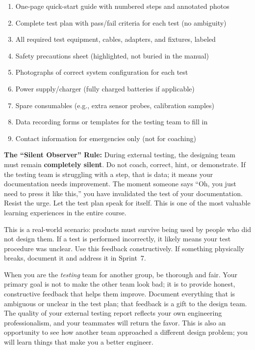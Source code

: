 \begin{checklistbox}
\begin{enumerate}[leftmargin=*, itemsep=1pt, topsep=0pt]
    \item One-page quick-start guide with numbered steps and annotated photos
    \item Complete test plan with pass/fail criteria for each test (no ambiguity)
    \item All required test equipment, cables, adapters, and fixtures, labeled
    \item Safety precautions sheet (highlighted, not buried in the manual)
    \item Photographs of correct system configuration for each test
    \item Power supply/charger (fully charged batteries if applicable)
    \item Spare consumables (e.g., extra sensor probes, calibration samples)
    \item Data recording forms or templates for the testing team to fill in
    \item Contact information for emergencies only (not for coaching)
\end{enumerate}
\end{checklistbox}

\begin{warnbox}
\textbf{The ``Silent Observer'' Rule:} During external testing, the designing team must remain \textbf{completely silent}. Do not coach, correct, hint, or demonstrate. If the testing team is struggling with a step, that is data; it means your documentation needs improvement. The moment someone says ``Oh, you just need to press it like this,'' you have invalidated the test of your documentation. Resist the urge. Let the test plan speak for itself. This is one of the most valuable learning experiences in the entire course.
\end{warnbox}

\begin{faqbox}
This is a real-world scenario: products must survive being used by people who did not design them. If a test is performed incorrectly, it likely means your test procedure was unclear. Use this feedback constructively. If something physically breaks, document it and address it in Sprint~7.
\end{faqbox}

\begin{protip}
When you are the \textit{testing} team for another group, be thorough and fair. Your primary goal is not to make the other team look bad; it is to provide honest, constructive feedback that helps them improve. Document everything that is ambiguous or unclear in the test plan; that feedback is a gift to the design team. The quality of your external testing report reflects your own engineering professionalism, and your teammates will return the favor. This is also an opportunity to see how another team approached a different design problem; you will learn things that make you a better engineer.
\end{protip}

